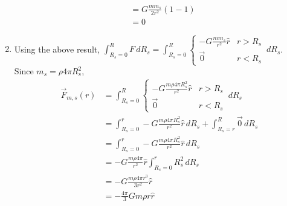 \documentclass{esg8012pset}
\renewcommand{\d}{\,d}
\begin{document}
\begin{solution}
\begin{enumerate}[1)]
\begin{align*}
     & = G \frac{m m_s}{2r^2} \left(1 - 1\right) \\
     & = 0
    \end{align*}
    \item Using the above result, $\displaystyle \int_{R_s=0}^{R} F\d{R_s} = \int_{R_s=0}^{R} \begin{cases} -G\frac{mm_s}{r^2}\hat r & r > R_s \\ \vec 0 & r < R_s\end{cases} \d{R_s}$.  Since $m_s = \rho 4\pi R_s^2$, \begin{align*}
     \vec F_{m,s}(r) & =  \int_{R_s=0}^{R} \begin{cases} -G\frac{m \rho 4\pi R_s^2 }{r^2}\hat r & r > R_s \\ \vec 0 & r < R_s\end{cases} \d{R_s} \\
     & = \int_{R_s=0}^{r} -G\frac{m \rho 4\pi R_s^2 }{r^2}\hat r \d{R_s} + \int_{R_s=r}^{R} \vec 0 \d{R_s} \\
     & = \int_{R_s=0}^{r} -G\frac{m \rho 4\pi R_s^2 }{r^2}\hat r \d{R_s} \\
     & = -G\frac{m \rho 4\pi}{r^2}\hat r \int_{R_s=0}^{r} R_s^2 \d{R_s} \\
     & = -G\frac{m \rho 4\pi r^3}{3 r^2}\hat r \\
     & = -\frac{4\pi}{3}G m \rho r\hat r
    \end{align*}
  \end{enumerate}
\end{solution}
\end{document}
